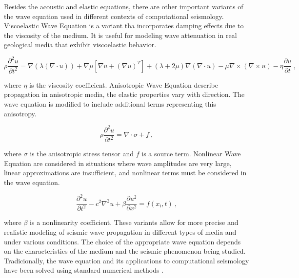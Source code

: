 \documentclass[11pt,twoside]{article}
\begin{document}
Besides the acoustic and elastic equations, there are other important variants of the wave equation used in different 
contexts of computational seismology. Viscoelastic Wave Equation is a variant tha incorporates damping effects due to 
the viscosity of the medium. It is useful for modeling wave attenuation in real geological media that exhibit 
viscoelastic behavior.

\begin{equation*}
\rho \frac{\partial^2 u}{\partial t^2} = \nabla (\lambda (\nabla \cdot u)) + \nabla \mu \left[\nabla u + (\nabla u)^T\right] 
+ (\lambda + 2\mu) \nabla (\nabla \cdot u) - \mu \nabla \times (\nabla \times u) - \eta \frac{\partial u}{\partial t} \ ,
\label{viscoelastic}
\end{equation*}
    
where $\eta$ is the viscosity coefficient. Anisotropic Wave Equation describe propagation in anisotropic media, 
the elastic properties vary with direction. The wave equation is modified to include additional terms representing 
this anisotropy.

\begin{equation*}
\rho \frac{\partial^2 u}{\partial t^2} = \nabla \cdot \sigma + f \ ,
\label{anisotropic}
\end{equation*}
    
where $\sigma$ is the anisotropic stress tensor and $f$ is a source term. Nonlinear Wave Equation are considered 
in situations where wave amplitudes are very large, linear approximations are insufficient, and nonlinear terms 
must be considered in the wave equation.

\begin{equation*}
\frac{\partial^2 u}{\partial t^2} - c^2 \nabla^2 u + \beta \frac{\partial u^2}{\partial x^2} = f(x_i, t) \ ,
\label{nonlinear}
\end{equation*}
    
where $\beta$ is a nonlinearity coefficient. These variants allow for more precise and realistic modeling 
of seismic wave propagation in different types of media and under various conditions. The choice of the 
appropriate wave equation depends on the characteristics of the medium and the seismic phenomenon being studied. 
Tradicionally, the wave equation and its applications to computational seismology have been solved using standard 
numerical methods \citep{Igel2017}.

\end{document}
